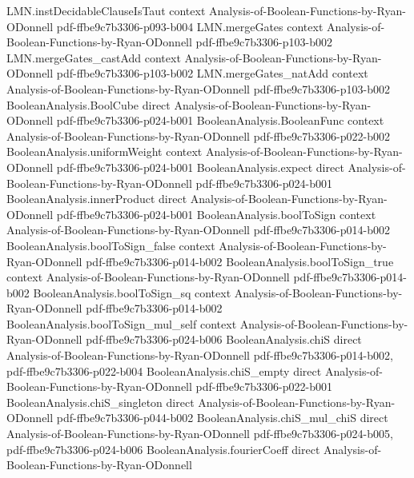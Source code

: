 \begin{lemma}
  {LMN.instDecidableClauseIsTaut}
  {context}
  {Analysis-of-Boolean-Functions-by-Ryan-ODonnell}
  {pdf-ffbe9c7b3306-p093-b004}
\proofstep
  {LMN.mergeGates}
  {context}
  {Analysis-of-Boolean-Functions-by-Ryan-ODonnell}
  {pdf-ffbe9c7b3306-p103-b002}
\proofstep
  {LMN.mergeGates_castAdd}
  {context}
  {Analysis-of-Boolean-Functions-by-Ryan-ODonnell}
  {pdf-ffbe9c7b3306-p103-b002}
\proofstep
  {LMN.mergeGates_natAdd}
  {context}
  {Analysis-of-Boolean-Functions-by-Ryan-ODonnell}
  {pdf-ffbe9c7b3306-p103-b002}
\proofstep
  {BooleanAnalysis.BoolCube}
  {direct}
  {Analysis-of-Boolean-Functions-by-Ryan-ODonnell}
  {pdf-ffbe9c7b3306-p024-b001}
\proofstep
  {BooleanAnalysis.BooleanFunc}
  {context}
  {Analysis-of-Boolean-Functions-by-Ryan-ODonnell}
  {pdf-ffbe9c7b3306-p022-b002}
\proofstep
  {BooleanAnalysis.uniformWeight}
  {context}
  {Analysis-of-Boolean-Functions-by-Ryan-ODonnell}
  {pdf-ffbe9c7b3306-p024-b001}
\proofstep
  {BooleanAnalysis.expect}
  {direct}
  {Analysis-of-Boolean-Functions-by-Ryan-ODonnell}
  {pdf-ffbe9c7b3306-p024-b001}
\proofstep
  {BooleanAnalysis.innerProduct}
  {direct}
  {Analysis-of-Boolean-Functions-by-Ryan-ODonnell}
  {pdf-ffbe9c7b3306-p024-b001}
\proofstep
  {BooleanAnalysis.boolToSign}
  {context}
  {Analysis-of-Boolean-Functions-by-Ryan-ODonnell}
  {pdf-ffbe9c7b3306-p014-b002}
\proofstep
  {BooleanAnalysis.boolToSign_false}
  {context}
  {Analysis-of-Boolean-Functions-by-Ryan-ODonnell}
  {pdf-ffbe9c7b3306-p014-b002}
\proofstep
  {BooleanAnalysis.boolToSign_true}
  {context}
  {Analysis-of-Boolean-Functions-by-Ryan-ODonnell}
  {pdf-ffbe9c7b3306-p014-b002}
\proofstep
  {BooleanAnalysis.boolToSign_sq}
  {context}
  {Analysis-of-Boolean-Functions-by-Ryan-ODonnell}
  {pdf-ffbe9c7b3306-p014-b002}
\proofstep
  {BooleanAnalysis.boolToSign_mul_self}
  {context}
  {Analysis-of-Boolean-Functions-by-Ryan-ODonnell}
  {pdf-ffbe9c7b3306-p024-b006}
\proofstep
  {BooleanAnalysis.chiS}
  {direct}
  {Analysis-of-Boolean-Functions-by-Ryan-ODonnell}
  {pdf-ffbe9c7b3306-p014-b002,
    pdf-ffbe9c7b3306-p022-b004}
\proofstep
  {BooleanAnalysis.chiS_empty}
  {direct}
  {Analysis-of-Boolean-Functions-by-Ryan-ODonnell}
  {pdf-ffbe9c7b3306-p022-b001}
\proofstep
  {BooleanAnalysis.chiS_singleton}
  {direct}
  {Analysis-of-Boolean-Functions-by-Ryan-ODonnell}
  {pdf-ffbe9c7b3306-p044-b002}
\proofstep
  {BooleanAnalysis.chiS_mul_chiS}
  {direct}
  {Analysis-of-Boolean-Functions-by-Ryan-ODonnell}
  {pdf-ffbe9c7b3306-p024-b005,
    pdf-ffbe9c7b3306-p024-b006}
\proofstep
  {BooleanAnalysis.fourierCoeff}
  {direct}
  {Analysis-of-Boolean-Functions-by-Ryan-ODonnell}

\end{lemma}
